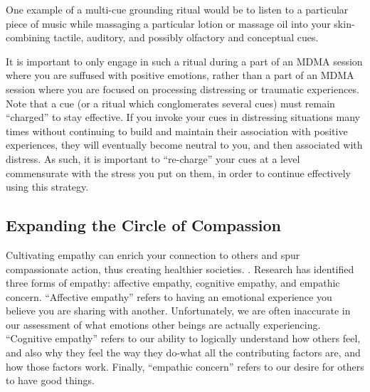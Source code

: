 \documentclass[12pt,letterpaper]{article}
\begin{document}
One example of a multi-cue grounding ritual would be to listen to a particular piece of music while massaging a particular lotion or massage oil into your skin-combining tactile, auditory, and possibly olfactory and conceptual cues.

It is important to only engage in such a ritual during a part of an MDMA session where you are suffused with positive emotions, rather than a part of an MDMA session where you are focused on processing distressing or traumatic experiences. Note that a cue (or a ritual which conglomerates several cues) must remain “charged” to stay effective. If you invoke your cues in distressing situations many times without continuing to build and maintain their association with positive experiences, they will eventually become neutral to you, and then associated with distress. As such, it is important to “re-charge” your cues at a level commensurate with the stress you put on them, in order to continue effectively using this strategy.
\subsection{Expanding the Circle of Compassion}
\label{sec:circle}
Cultivating empathy can enrich your connection to others and spur compassionate action, thus creating healthier societies. . Research has identified three forms of empathy: affective empathy, cognitive empathy, and empathic concern. “Affective empathy” refers to having an emotional experience you believe you are sharing with another. Unfortunately, we are often inaccurate in our assessment of what emotions other beings are actually experiencing. “Cognitive empathy” refers to our ability to logically understand how others feel, and also why they feel the way they do-what all the contributing factors are, and how those factors work. Finally, “empathic concern” refers to our desire for others to have good things.
\end{document}
